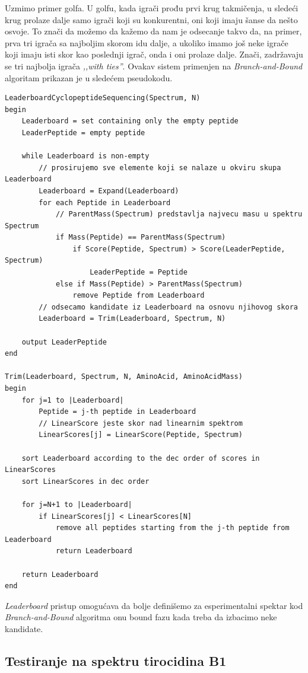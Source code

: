 Uzmimo primer golfa. U golfu, kada igrači prođu prvi krug takmičenja, u sledeći krug prolaze dalje samo igrači koji su konkurentni, oni koji imaju šanse da nešto osvoje. To znači da možemo da kažemo da nam je odsecanje takvo da, na primer, prva tri igrača sa najboljim skorom idu dalje, a ukoliko imamo još neke igrače koji imaju isti skor kao poslednji igrač, onda i oni prolaze dalje. Znači, zadržavaju se tri najbolja igrača \textit{,,with ties''}. Ovakav sistem primenjen na \textit{Branch-and-Bound} algoritam prikazan je u sledećem pseudokodu.

\begin{lstlisting}
LeaderboardCyclopeptideSequencing(Spectrum, N)
begin
	Leaderboard = set containing only the empty peptide
	LeaderPeptide = empty peptide
	
	while Leaderboard is non-empty
		// prosirujemo sve elemente koji se nalaze u okviru skupa Leaderboard
		Leaderboard = Expand(Leaderboard)
		for each Peptide in Leaderboard
			// ParentMass(Spectrum) predstavlja najvecu masu u spektru Spectrum
			if Mass(Peptide) == ParentMass(Spectrum)
				if Score(Peptide, Spectrum) > Score(LeaderPeptide, Spectrum)
					LeaderPeptide = Peptide
			else if Mass(Peptide) > ParentMass(Spectrum)
				remove Peptide from Leaderboard
		// odsecamo kandidate iz Leaderboard na osnovu njihovog skora
		Leaderboard = Trim(Leaderboard, Spectrum, N)
		
	output LeaderPeptide
end

Trim(Leaderboard, Spectrum, N, AminoAcid, AminoAcidMass)
begin
	for j=1 to |Leaderboard|
		Peptide = j-th peptide in Leaderboard
		// LinearScore jeste skor nad linearnim spektrom
		LinearScores[j] = LinearScore(Peptide, Spectrum)
		
	sort Leaderboard according to the dec order of scores in LinearScores
	sort LinearScores in dec order
	
	for j=N+1 to |Leaderboard|
		if LinearScores[j] < LinearScores[N]
			remove all peptides starting from the j-th peptide from Leaderboard
			return Leaderboard
			
	return Leaderboard
end
\end{lstlisting}

\noindent \textit{Leaderboard} pristup omogućava da bolje definišemo za esperimentalni spektar kod \textit{Branch-and-Bound} algoritma onu bound fazu kada treba da izbacimo neke kandidate. 

\subsection{Testiranje na spektru tirocidina B1}

